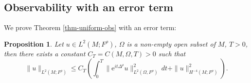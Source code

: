 \documentclass[11pt,oneside,reqno]{amsart}
\newtheorem{proposition}[theorem]{Proposition}
\theoremstyle{definition}
\numberwithin{equation}{section}
\theoremstyle{plain}
\begin{document}
\subsection{Observability with an error term} We prove Theorem \ref{thm-uniform-obs} with an error term:
\begin{proposition}\label{prp-obs-error}
Let $u \in L^2(M;F^{\rho})$, $\Omega$ is a non-empty open subset of $M$, $T>0$, then there exists a constant $C_T=C(M, \Omega, T)>0$ such that 
\begin{equation}
\|u\|_{L^2(M;F^{\rho})} \leq C_T\left(\int_{0}^{T}\|\mathrm{e}^{it \Delta^{\rho}}u\|^2_{L^2(\Omega,F^{\rho})}\,d t+ \|u\|^2_{H^{-4}(M;F^\rho)}\right).\label{eqn-obs-error}
\end{equation}

\end{proposition}
\end{document}
